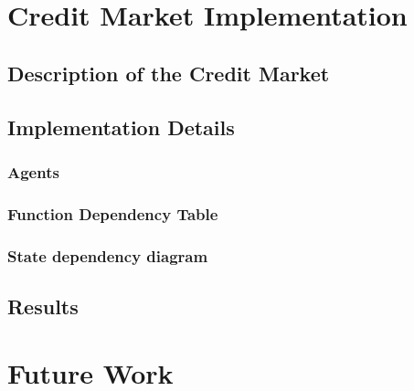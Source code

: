 \chapter{Credit Market Implementation}

\section{Description of the Credit Market}

\section{Implementation Details}
\subsection{Agents}
\subsection{Function Dependency Table}
\subsection{State dependency diagram}
\section{Results}

\chapter{Future Work}